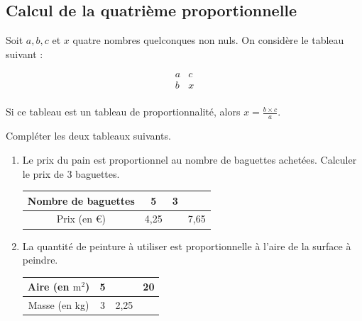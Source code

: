 \documentclass[a4paper]{book}
\begin{document}
    
\subsection{Calcul de la quatrième proportionnelle}
    
    \begin{propriete} 
        Soit \( a, b, c \) et \( x \) quatre nombres quelconques non nuls. On considère le tableau suivant :
    
        \[
        \begin{array}{c|c}
        a & c \\ \hline
        b & x \\
        \end{array}
        \]
    
        Si ce tableau est un tableau de proportionnalité, alors \( x = \frac{b \times c}{a} \).
    \end{propriete}
       
    \begin{exemple} 
        Compléter les deux tableaux suivants.
        \begin{enumerate}
            \item Le prix du pain est proportionnel au nombre de baguettes achetées. Calculer le prix de 3 baguettes.

            \vspace{0.5cm}
    
            \begin{tabular}{|c|c|c|c|}
                \hline
                Nombre de baguettes & 5 & 3 &  \\ \hline
                Prix (en €) & 4,25 &  & 7,65 \\ \hline
            \end{tabular}

            \vspace{0.5cm}

            \item La quantité de peinture à utiliser est proportionnelle à l'aire de la surface à peindre. 

            \vspace{0.5cm}
           
            \begin{tabular}{|c|c|c|c|}
                \hline
                Aire (en \( \mathrm{m}^2 \))& 5 & & 20 \\ \hline
                Masse (en kg) & 3 & 2,25 &  \\ \hline
            \end{tabular}

            \vspace{0.5cm}
        \end{enumerate}
    \end{exemple}
\end{document}
